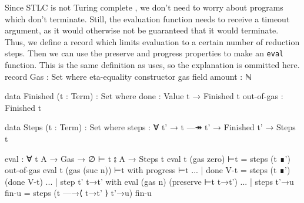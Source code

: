 \documentclass[logo,bsc,singlespacing,parskip,online]{infthesis}
\renewenvironment{code}{\mintedcopy[breaklines,breaksymbolleft=\;]{agda}}{\endmintedcopy}
\begin{document}
Since STLC is not Turing complete \citep{church_formulation_1940}, we don't need to worry about
programs which don't terminate. Still, the evaluation function needs to receive a timeout argument,
as it would otherwise not be guaranteed that it would terminate. Thus, we define a record which
limits evaluation to a certain number of reduction steps. Then we can use the preserve and progress
properties to make an \texttt{eval} function. This is the same definition as
\citet{wadler_programming_2022} uses, so the explanation is ommitted here.
\begin{code}
  record Gas : Set where
    eta-equality
    constructor gas
    field
      amount : ℕ

  data Finished (t : Term) : Set where
    done : Value t → Finished t
    out-of-gas : Finished t

  data Steps (t : Term) : Set where
    steps : ∀ {t'} → t —↠ t' → Finished t' → Steps t

  eval : ∀ {t A} → Gas → ∅ ⊢ t ⦂ A → Steps t
  eval {t} (gas zero) ⊢t = steps (t ∎') out-of-gas
  eval {t} (gas (suc n)) ⊢t with progress ⊢t
  ... | done V-t = steps (t ∎') (done V-t)
  ... | step {t'} t→t' with eval (gas n) (preserve ⊢t t→t')
  ...   | steps t'→u fin-u = steps (t —→⟨ t→t' ⟩ t'→u) fin-u
\end{code}
\end{document}
